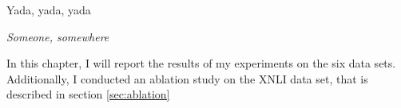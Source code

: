 \label{chap:5_results}

\epigraph{Yada, yada, yada}{\textit{Someone, somewhere}}

In this chapter, I will report the results of my experiments on the six data sets. Additionally, I
conducted an ablation study on the XNLI data set, that is described in section \ref{sec:ablation}














